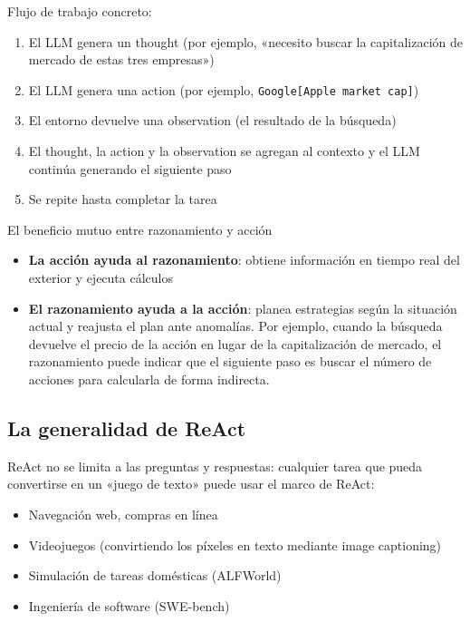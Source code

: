 \documentclass[a4paper]{article}
\begin{document}
Flujo de trabajo concreto:
\begin{enumerate}
    \item El LLM genera un thought (por ejemplo, «necesito buscar la capitalización de mercado de estas tres empresas»)
    \item El LLM genera una action (por ejemplo, \texttt{Google{[}Apple market cap{]}})
    \item El entorno devuelve una observation (el resultado de la búsqueda)
    \item El thought, la action y la observation se agregan al contexto y el LLM continúa generando el siguiente paso
    \item Se repite hasta completar la tarea
\end{enumerate}

\begin{knowledgebox}{El beneficio mutuo entre razonamiento y acción}
\begin{itemize}
    \item \textbf{La acción ayuda al razonamiento}: obtiene información en tiempo real del exterior y ejecuta cálculos
    \item \textbf{El razonamiento ayuda a la acción}: planea estrategias según la situación actual y reajusta el plan ante anomalías. Por ejemplo, cuando la búsqueda devuelve el precio de la acción en lugar de la capitalización de mercado, el razonamiento puede indicar que el siguiente paso es buscar el número de acciones para calcularla de forma indirecta.
\end{itemize}
\end{knowledgebox}

\subsection{La generalidad de ReAct}

ReAct no se limita a las preguntas y respuestas: cualquier tarea que pueda convertirse en un «juego de texto» puede usar el marco de ReAct:

\begin{itemize}
    \item Navegación web, compras en línea
    \item Videojuegos (convirtiendo los píxeles en texto mediante image captioning)
    \item Simulación de tareas domésticas (ALFWorld)
    \item Ingeniería de software (SWE-bench)
\end{itemize}
\end{document}
